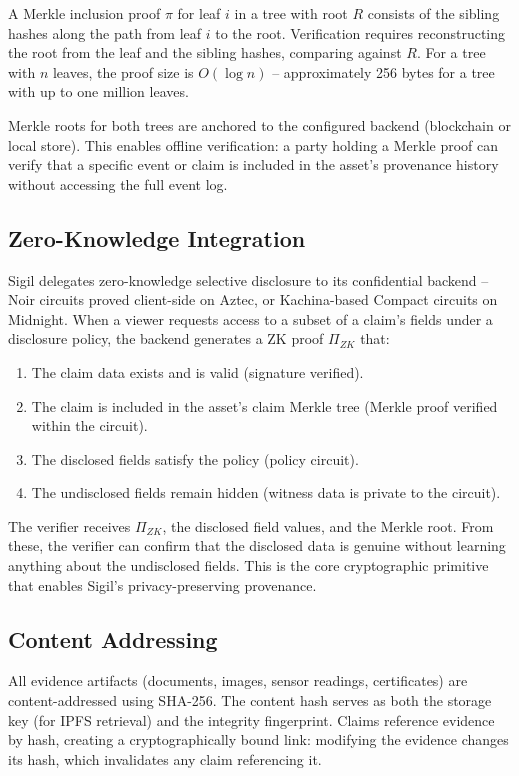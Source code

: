 \documentclass[conference]{IEEEtran}
\begin{document}
A Merkle inclusion proof $\pi$ for leaf $i$ in a tree with root $R$ consists
of the sibling hashes along the path from leaf $i$ to the root.  Verification
requires reconstructing the root from the leaf and the sibling hashes,
comparing against $R$.  For a tree with $n$ leaves, the proof size is $O(\log
n)$ -- approximately 256 bytes for a tree with up to one million leaves.

Merkle roots for both trees are anchored to the configured backend
(blockchain or local store).  This enables offline verification: a party
holding a Merkle proof can verify that a specific event or claim is included
in the asset's provenance history without accessing the full event log.

\subsection{Zero-Knowledge Integration}

Sigil delegates zero-knowledge selective disclosure to its confidential
backend -- Noir circuits proved client-side on Aztec, or Kachina-based Compact
circuits on Midnight.  When a viewer requests access to a subset of a claim's
fields under a disclosure policy, the backend generates a ZK proof
$\Pi_{ZK}$ that:

\begin{enumerate}
  \item The claim data exists and is valid (signature verified).
  \item The claim is included in the asset's claim Merkle tree (Merkle proof
        verified within the circuit).
  \item The disclosed fields satisfy the policy (policy circuit).
  \item The undisclosed fields remain hidden (witness data is private to the
        circuit).
\end{enumerate}

The verifier receives $\Pi_{ZK}$, the disclosed field values, and the Merkle
root.  From these, the verifier can confirm that the disclosed data is genuine
without learning anything about the undisclosed fields.  This is the core
cryptographic primitive that enables Sigil's privacy-preserving provenance.

\subsection{Content Addressing}

All evidence artifacts (documents, images, sensor readings, certificates) are
content-addressed using SHA-256.  The content hash serves as both the storage
key (for IPFS retrieval) and the integrity fingerprint.  Claims reference
evidence by hash, creating a cryptographically bound link: modifying the
evidence changes its hash, which invalidates any claim referencing it.
\end{document}
